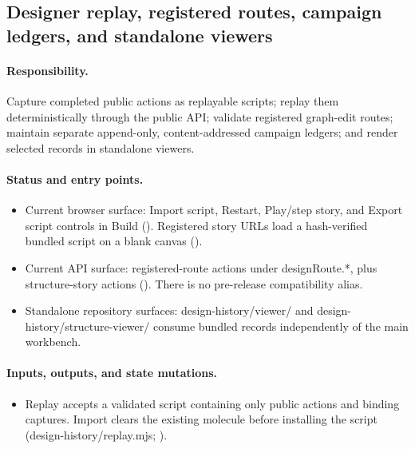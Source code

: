 \documentclass[11pt]{article}
\begin{document}
\begin{small}
\begin{itemize}[leftmargin=*]
\end{itemize}

\subsection{Designer replay, registered routes, campaign ledgers, and standalone viewers}\label{appB:sec19}

\paragraph{Responsibility.}

Capture completed public actions as replayable scripts; replay them deterministically through the public API; validate registered graph-edit routes; maintain separate append-only, content-addressed campaign ledgers; and render selected records in standalone viewers.

\paragraph{Status and entry points.}

\begin{itemize}[leftmargin=*]

\item Current browser surface: Import script, Restart, Play/step story, and Export script controls in Build (). Registered story URLs load a hash-verified bundled script on a blank canvas ().

\item Current API surface: registered-route actions under designRoute.*, plus structure-story actions (). There is no pre-release compatibility alias.

\item Standalone repository surfaces: design-history/viewer/ and design-history/structure-viewer/ consume bundled records independently of the main workbench.

\end{itemize}

\paragraph{Inputs, outputs, and state mutations.}

\begin{itemize}[leftmargin=*]

\item Replay accepts a validated script containing only public actions and binding captures. Import clears the existing molecule before installing the script (design-history/replay.mjs; ).


\end{itemize}
\end{small}
\end{document}
